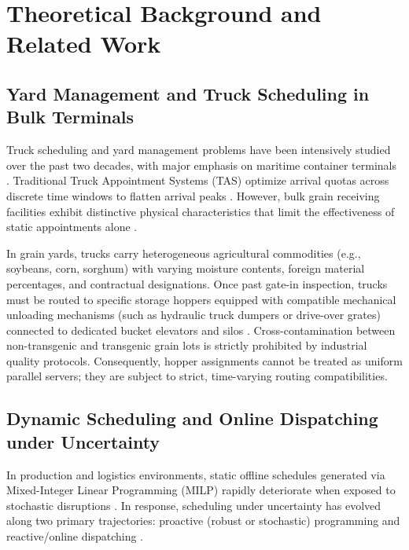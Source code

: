\documentclass[12pt,a4paper]{article}
\begin{document}
\section{Theoretical Background and Related Work}
\label{sec:background}

\subsection{Yard Management and Truck Scheduling in Bulk Terminals}
Truck scheduling and yard management problems have been intensively studied over the past two decades, with major emphasis on maritime container terminals \parencite{abdelmagidComprehensiveReviewTruck2022a}. Traditional Truck Appointment Systems (TAS) optimize arrival quotas across discrete time windows to flatten arrival peaks \parencite{azabDynamicCollaborativeTruck2017a, bouyahiaNovelTruckAppointment2025b}. However, bulk grain receiving facilities exhibit distinctive physical characteristics that limit the effectiveness of static appointments alone \parencite{t.j.herrmanUseSimulationModel2002a, turnerDiscreteEventSimulation2019a}. 

In grain yards, trucks carry heterogeneous agricultural commodities (e.g., soybeans, corn, sorghum) with varying moisture contents, foreign material percentages, and contractual designations. Once past gate-in inspection, trucks must be routed to specific storage hoppers equipped with compatible mechanical unloading mechanisms (such as hydraulic truck dumpers or drive-over grates) connected to dedicated bucket elevators and silos \parencite{r.berrutoAnalyzingReceivingOperation2001a, m.e.a.inglesEffectsGrainreceivingSystem2006a}. Cross-contamination between non-transgenic and transgenic grain lots is strictly prohibited by industrial quality protocols. Consequently, hopper assignments cannot be treated as uniform parallel servers; they are subject to strict, time-varying routing compatibilities.

\subsection{Dynamic Scheduling and Online Dispatching under Uncertainty}
In production and logistics environments, static offline schedules generated via Mixed-Integer Linear Programming (MILP) rapidly deteriorate when exposed to stochastic disruptions \parencite{liProcessSchedulingUncertainty2008a}. In response, scheduling under uncertainty has evolved along two primary trajectories: proactive (robust or stochastic) programming and reactive/online dispatching \parencite{boysenCrossDockScheduling2010a, nasiriPredictivereactiveCrossdockRescheduling2022}.
\end{document}
